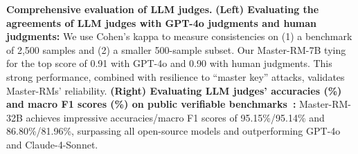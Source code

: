 \begin{table}[htbp]
    \vspace{-2mm}
    \caption{\textbf{Comprehensive evaluation of LLM judges.} 
    \textbf{(Left) Evaluating the agreements of LLM judges with GPT-4o judgments and human judgments:} We use Cohen's kappa to measure consistencies on (1) a benchmark of 2,500 samples and (2) a smaller 500-sample subset. Our Master-RM-7B tying for the top score of 0.91 with GPT-4o and 0.90 with human judgments. This strong performance, combined with resilience to ``master key'' attacks, validates Master-RMs' reliability. 
    \textbf{(Right) Evaluating LLM judges' accuracies (\%) and macro F1 scores (\%) on public verifiable benchmarks~\citep{yan2025verifybench}:} Master-RM-32B achieves impressive accuracies/macro F1 scores of 95.15\%/95.14\% and 86.80\%/81.96\%, surpassing all open-source models and outperforming GPT-4o and Claude-4-Sonnet.}
    \vspace{-2mm}
\end{table}

